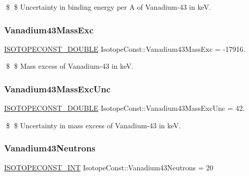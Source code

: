 \$ \$ Uncertainty in binding energy per A of Vanadium-\/43 in keV. \mbox{\label{group___isotope_const-_vanadium-_v43_ga7f5ea7abcde9ce31f4c35e0674bee7fe}} 
\subsubsection{\texorpdfstring{Vanadium43\+Mass\+Exc}{Vanadium43MassExc}}
{\footnotesize\ttfamily \mbox{\hyperlink{group___isotope_const-_macros_ga8f45a7272ce02c0b4c65c44636ed719a}{I\+S\+O\+T\+O\+P\+E\+C\+O\+N\+S\+T\+\_\+\+D\+O\+U\+B\+LE}} Isotope\+Const\+::\+Vanadium43\+Mass\+Exc = -\/17916.}

\$ \$ Mass excess of Vanadium-\/43 in keV. \mbox{\label{group___isotope_const-_vanadium-_v43_ga4092cdc4b19ca35ecbd253fbdaca520b}} 
\subsubsection{\texorpdfstring{Vanadium43\+Mass\+Exc\+Unc}{Vanadium43MassExcUnc}}
{\footnotesize\ttfamily \mbox{\hyperlink{group___isotope_const-_macros_ga8f45a7272ce02c0b4c65c44636ed719a}{I\+S\+O\+T\+O\+P\+E\+C\+O\+N\+S\+T\+\_\+\+D\+O\+U\+B\+LE}} Isotope\+Const\+::\+Vanadium43\+Mass\+Exc\+Unc = 42.}

\$ \$ Uncertainty in mass excess of Vanadium-\/43 in keV. \mbox{\label{group___isotope_const-_vanadium-_v43_gaf23f33d85458c4dbb946d03d06de6e5e}} 
\subsubsection{\texorpdfstring{Vanadium43\+Neutrons}{Vanadium43Neutrons}}
{\footnotesize\ttfamily \mbox{\hyperlink{group___isotope_const-_macros_ga5f18360b3e99483a35c32d789e62621c}{I\+S\+O\+T\+O\+P\+E\+C\+O\+N\+S\+T\+\_\+\+I\+NT}} Isotope\+Const\+::\+Vanadium43\+Neutrons = 20}


